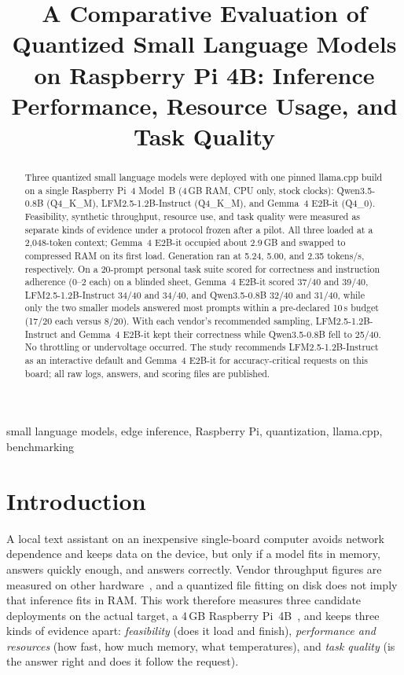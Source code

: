 \documentclass[conference]{IEEEtran}
\newcommand{\qwen}{Qwen3.5-0.8B}
\newcommand{\lfm}{LFM2.5-1.2B-Instruct}
\newcommand{\gemma}{Gemma~4 E2B-it}
\begin{document}
\title{A Comparative Evaluation of Quantized Small Language Models on Raspberry Pi 4B: Inference Performance, Resource Usage, and Task Quality}

\author{
}

\maketitle

\begin{abstract}
Three quantized small language models were deployed with one pinned llama.cpp build on a single Raspberry Pi~4 Model~B (4\,GB RAM, CPU only, stock clocks): \qwen{} (Q4\_K\_M), \lfm{} (Q4\_K\_M), and \gemma{} (Q4\_0). Feasibility, synthetic throughput, resource use, and task quality were measured as separate kinds of evidence under a protocol frozen after a pilot. All three loaded at a 2{,}048-token context; \gemma{} occupied about 2.9\,GB and swapped to compressed RAM on its first load. Generation ran at 5.24, 5.00, and 2.35 tokens/s, respectively. On a 20-prompt personal task suite scored for correctness and instruction adherence (0--2 each) on a blinded sheet, \gemma{} scored 37/40 and 39/40, \lfm{} 34/40 and 34/40, and \qwen{} 32/40 and 31/40, while only the two smaller models answered most prompts within a pre-declared 10\,s budget (17/20 each versus 8/20). With each vendor's recommended sampling, \lfm{} and \gemma{} kept their correctness while \qwen{} fell to 25/40. No throttling or undervoltage occurred. The study recommends \lfm{} as an interactive default and \gemma{} for accuracy-critical requests on this board; all raw logs, answers, and scoring files are published.
\end{abstract}

\begin{IEEEkeywords}
small language models, edge inference, Raspberry Pi, quantization, llama.cpp, benchmarking
\end{IEEEkeywords}

\section{Introduction}
A local text assistant on an inexpensive single-board computer avoids network dependence and keeps data on the device, but only if a model fits in memory, answers quickly enough, and answers correctly. Vendor throughput figures are measured on other hardware~\cite{gemma4overview}, and a quantized file fitting on disk does not imply that inference fits in RAM. This work therefore measures three candidate deployments on the actual target, a 4\,GB Raspberry Pi~4B~\cite{rpidocs}, and keeps three kinds of evidence apart: \emph{feasibility} (does it load and finish), \emph{performance and resources} (how fast, how much memory, what temperatures), and \emph{task quality} (is the answer right and does it follow the request).
\end{document}
